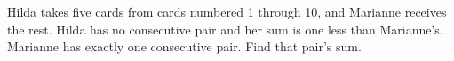 Hilda takes five cards from cards numbered 1 through 10, and Marianne receives the rest. Hilda has no consecutive pair and her sum is one less than Marianne's. Marianne has exactly one consecutive pair. Find that pair's sum.
